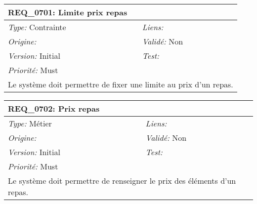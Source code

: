 \begin{table}[!h]

\begin{tabular}{|p{60mm}p{100mm}|}

\hline

\multicolumn{2}{|l|}{\textbf{REQ\_0701:} Limite prix repas} \\ \hline

\emph{Type:} Contrainte & \emph{Liens:}  \\

\emph{Origine:}  & \emph{Validé:} Non \\

\emph{Version:} Initial & \emph{Test:}  \\

\emph{Priorité:} Must & \\ \hline

\multicolumn{2}{|p{16cm}|}{Le système doit permettre de fixer une limite au prix d'un repas.} \\ \hline

\end{tabular}

\end{table}



\begin{table}[!h]

\begin{tabular}{|p{60mm}p{100mm}|}

\hline

\multicolumn{2}{|l|}{\textbf{REQ\_0702:} Prix repas} \\ \hline

\emph{Type:} Métier & \emph{Liens:}  \\

\emph{Origine:}  & \emph{Validé:} Non \\

\emph{Version:} Initial & \emph{Test:}  \\

\emph{Priorité:} Must & \\ \hline

\multicolumn{2}{|p{16cm}|}{Le système doit permettre de renseigner le prix des éléments d'un repas.} \\ \hline

\end{tabular}

\end{table}



